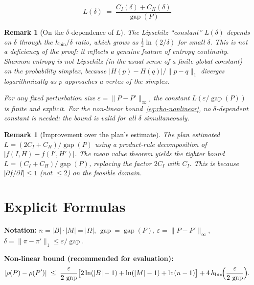 \documentclass[11pt]{article}
\newtheorem{remark}[theorem]{Remark}
\DeclareMathOperator{\gap}{gap}
\begin{document}
\begin{equation}\label{eq:L-final}
  \boxed{L(\delta) \;=\; \frac{C_I(\delta) + C_H(\delta)}{\gap(P)}}
\end{equation}

\begin{remark}[On the $\delta$-dependence of $L$]
The Lipschitz ``constant'' $L(\delta)$ depends on $\delta$ through
the $h_{\mathrm{bin}}/\delta$ ratio, which grows as $\frac{1}{2}\ln(2/\delta)$
for small $\delta$.  This is not a deficiency of the proof: it reflects
a genuine feature of entropy continuity.  Shannon entropy is \emph{not}
Lipschitz (in the usual sense of a finite global constant) on the
probability simplex, because $|H(p) - H(q)|/\|p-q\|_1$ diverges
logarithmically as $p$ approaches a vertex of the simplex.

For any \emph{fixed} perturbation size $\varepsilon = \|P - P'\|_\infty$,
the constant $L(\varepsilon/\gap(P))$ is finite and explicit.
For the non-linear bound~\eqref{eq:rho-nonlinear}, no $\delta$-dependent
constant is needed: the bound is valid for all $\delta$ simultaneously.
\end{remark}

\begin{remark}[Improvement over the plan's estimate]
The plan estimated $L = (2C_I + C_H)/\gap(P)$ using a product-rule
decomposition of $|f(I,H) - f(I',H')|$.  The mean value theorem
yields the tighter bound $L = (C_I + C_H)/\gap(P)$, replacing
the factor $2C_I$ with $C_I$.  This is because $|\partial f/\partial I| \le 1$
(not $\le 2$) on the feasible domain.
\end{remark}

\section{Explicit Formulas}

\textbf{Notation:} $n = |B| \cdot |M| = |\Omega|$,
$\gap = \gap(P)$, $\varepsilon = \|P - P'\|_\infty$,
$\delta = \|\pi - \pi'\|_1 \le \varepsilon/\gap$.

\medskip\noindent
\textbf{Non-linear bound (recommended for evaluation):}
\begin{equation}\label{eq:nonlinear-final}
  |\rho(P) - \rho(P')| \;\le\;
  \frac{\varepsilon}{2\,\gap}\bigl[2\ln(|B|-1) + \ln(|M|-1) + \ln(n-1)\bigr]
  + 4\,h_{\mathrm{bin}}\!\Bigl(\frac{\varepsilon}{2\,\gap}\Bigr).
\end{equation}
\end{document}
